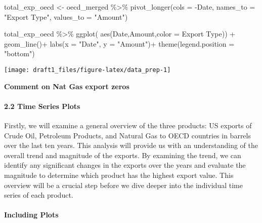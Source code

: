\documentclass[
]{article}
\newenvironment{Shaded}{\begin{snugshade}}{\end{snugshade}}
\newcommand{\AttributeTok}[1]{\textcolor[rgb]{0.77,0.63,0.00}{#1}}
\newcommand{\FunctionTok}[1]{\textcolor[rgb]{0.00,0.00,0.00}{#1}}
\newcommand{\NormalTok}[1]{#1}
\newcommand{\OtherTok}[1]{\textcolor[rgb]{0.56,0.35,0.01}{#1}}
\newcommand{\SpecialCharTok}[1]{\textcolor[rgb]{0.00,0.00,0.00}{#1}}
\newcommand{\StringTok}[1]{\textcolor[rgb]{0.31,0.60,0.02}{#1}}
\begin{document}
\begin{Shaded}
\begin{Highlighting}[]
\NormalTok{total\_exp\_oecd }\OtherTok{\textless{}{-}}\NormalTok{ oecd\_merged }\SpecialCharTok{\%\textgreater{}\%}
  \FunctionTok{pivot\_longer}\NormalTok{(}\AttributeTok{cols =} \SpecialCharTok{{-}}\NormalTok{Date, }\AttributeTok{names\_to =} \StringTok{"Export Type"}\NormalTok{, }\AttributeTok{values\_to =} \StringTok{"Amount"}\NormalTok{)}


\NormalTok{total\_exp\_oecd }\SpecialCharTok{\%\textgreater{}\%} \FunctionTok{ggplot}\NormalTok{(}
 \FunctionTok{aes}\NormalTok{(Date,Amount,}\AttributeTok{color =} \StringTok{\textasciigrave{}}\AttributeTok{Export Type}\StringTok{\textasciigrave{}}\NormalTok{)) }\SpecialCharTok{+}
   \FunctionTok{geom\_line}\NormalTok{()}\SpecialCharTok{+}
   \FunctionTok{labs}\NormalTok{(}\AttributeTok{x =} \StringTok{"Date"}\NormalTok{, }\AttributeTok{y =} \StringTok{"Amount"}\NormalTok{)}\SpecialCharTok{+}
  \FunctionTok{theme}\NormalTok{(}\AttributeTok{legend.position =} \StringTok{"bottom"}\NormalTok{)}
\end{Highlighting}
\end{Shaded}

\begin{center}\texttt{[image: draft1\_files/figure-latex/data\_prep-1]} \end{center}

\textbf{Comment on Nat Gas export zeros}

\hypertarget{time-series-plots}{%
\paragraph{2.2 Time Series Plots}\label{time-series-plots}}

Firstly, we will examine a general overview of the three products: US
exports of Crude Oil, Petroleum Products, and Natural Gas to OECD
countries in barrels over the last ten years. This analysis will provide
us with an understanding of the overall trend and magnitude of the
exports. By examining the trend, we can identify any significant changes
in the exports over the years and evaluate the magnitude to determine
which product has the highest export value. This overview will be a
crucial step before we dive deeper into the individual time series of
each product.

\hypertarget{including-plots}{%
\paragraph{Including Plots}\label{including-plots}}
\end{document}
